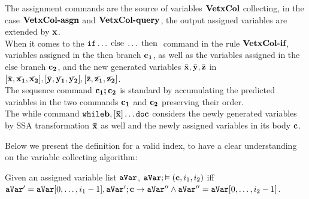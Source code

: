 \documentclass[a4paper,11pt]{article}
\begin{document}
The assignment commands are the source of variables $\bf{VetxCol}$ collecting, 
	in the case $\textbf{\bf{VetxCol}-asgn}$ and $\textbf{\bf{VetxCol}-query}$, 
	the output assigned variables are extended by $\boldsymbol{\mathbf{x}}$. 
\\
	When it comes to the $\mathtt{if} \ldots \mbox{\;else\;} \ldots \mbox{\;then\;}$ command in the rule $\textbf{\bf{VetxCol}-if}$, variables assigned in the then branch $\boldsymbol{\mathbf{c_1}}$, as well as the variables assigned in the else branch $\boldsymbol{\mathbf{c_2}}$, and the new generated variables $\bar{\boldsymbol{\mathbf{x}}},\bar{\boldsymbol{\mathbf{y}}},\bar{\boldsymbol{\mathbf{z}}}$ in $ [ \bar{\boldsymbol{\mathbf{x}}}, \bar{\boldsymbol{\mathbf{x_1}}}, \bar{\boldsymbol{\mathbf{x_2}}}] ,[ \bar{\boldsymbol{\mathbf{y}}}, \bar{\boldsymbol{\mathbf{y_1}}}, \bar{\boldsymbol{\mathbf{y_2}}}],[ \bar{\boldsymbol{\mathbf{z}}}, \bar{\boldsymbol{\mathbf{z_1}}}, \bar{\boldsymbol{\mathbf{z_2}}}]$.
\\ 
	The sequence command $\boldsymbol{\mathbf{c_1;c_2}}$ is standard by accumulating the predicted variables in the two commands $\boldsymbol{\mathbf{c_1}}$ and $\boldsymbol{\mathbf{c_2}}$ preserving their order. 
\\
	The while command $\mathtt{while} \boldsymbol{\mathbf{b}}, [\boldsymbol{\mathbf{\bar{x}}}] \ldots \mathtt{do} \boldsymbol{\mathbf{c}}$ considers the newly generated variables by SSA transformation $\boldsymbol{\mathbf{\bar{x}}}$
	as well and the newly assigned variables in its body $\boldsymbol{\mathbf{c}}$.

%
Below we present the definition for a valid index, to have a clear understanding on the variable collecting algorithm:
%
%
\begin{defn}
Given an assigned variable list $\mathtt{aVar}$, $\mathtt{aVar}; \vDash (\boldsymbol{\mathbf{c}},i_1,i_2)$ iff 
$\mathtt{aVar}' = \mathtt{aVar}[0,\ldots, i_1-1], \mathtt{aVar}';\boldsymbol{\mathbf{c}} \to \mathtt{aVar}'' \land \mathtt{aVar}'' = \mathtt{aVar}[0, \ldots, i_2-1] $.  
\end{defn}
%
%
\end{document}
